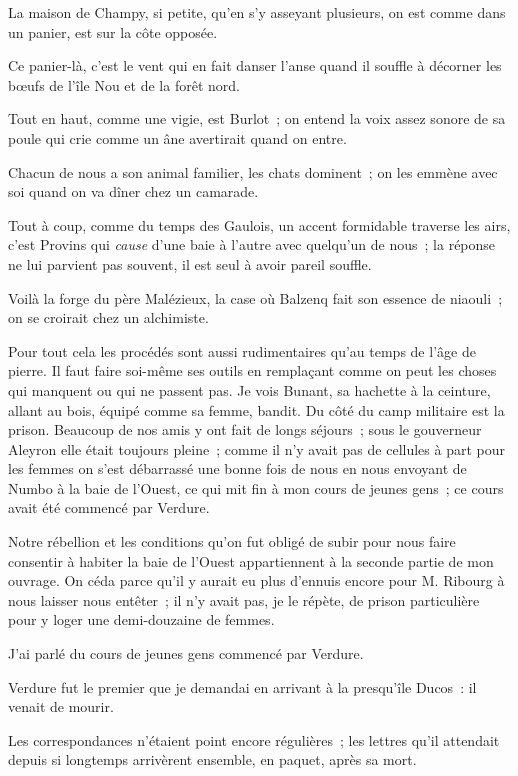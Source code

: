 \documentclass[french,twoside]{book} %
\begin{document}
La maison de Champy, si petite, qu’en s’y asseyant plusieurs, on est comme dans un panier, est sur la côte opposée.\par
Ce panier-là, c’est le vent qui en fait danser l’anse quand il souffle à décorner les bœufs de l’île Nou et de la forêt nord.\par
Tout en haut, comme une vigie, est Burlot ; on entend la voix assez sonore de sa poule qui crie comme un âne avertirait quand on entre.\par
Chacun de nous a son animal familier, les chats dominent ; on les emmène avec soi quand on va dîner chez un camarade.\par
Tout à coup, comme du temps des Gaulois, un accent formidable traverse les airs, c’est Provins qui \emph{cause} d’une baie à l’autre avec quelqu’un de  nous ; la réponse ne lui parvient pas souvent, il est seul à avoir pareil souffle.\par
Voilà la forge du père Malézieux, la case où Balzenq fait son essence de niaouli ; on se croirait chez un alchimiste.\par
Pour tout cela les procédés sont aussi rudimentaires qu’au temps de l’âge de pierre. Il faut faire soi-même ses outils en remplaçant comme on peut les choses qui manquent ou qui ne passent pas. Je vois Bunant, sa hachette à la ceinture, allant au bois, équipé comme sa femme, bandit. Du côté du camp militaire est la prison. Beaucoup de nos amis y ont fait de longs séjours ; sous le gouverneur Aleyron elle était toujours pleine ; comme il n’y avait pas de cellules à part pour les femmes on s’est débarrassé une bonne fois de nous en nous envoyant de Numbo à la baie de l’Ouest, ce qui mit fin à mon cours de jeunes gens ; ce cours avait été commencé par Verdure.\par
Notre rébellion et les conditions qu’on fut obligé de subir pour nous faire consentir à habiter la baie de l’Ouest appartiennent à la seconde partie de mon ouvrage. On céda parce qu’il y aurait eu plus d’ennuis encore pour M. Ribourg à nous laisser nous entêter ; il n’y avait pas, je le répète, de prison particulière pour y loger une demi-douzaine de femmes.\par
 J’ai parlé du cours de jeunes gens commencé par Verdure.\par
Verdure fut le premier que je demandai en arrivant à la presqu’île Ducos : il venait de mourir.\par
Les correspondances n’étaient point encore régulières ; les lettres qu’il attendait depuis si longtemps arrivèrent ensemble, en paquet, après sa mort.\par
\end{document}
